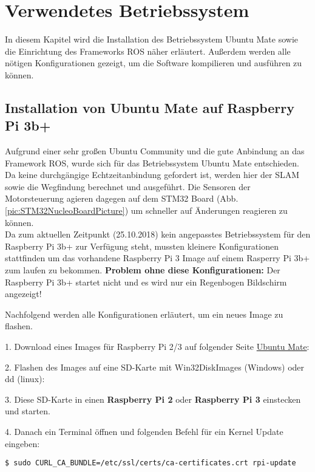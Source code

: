 \chapter{Verwendetes Betriebssystem}
In diesem Kapitel wird die Installation des Betriebssystem Ubuntu Mate sowie die Einrichtung des Frameworks ROS näher erläutert. Außerdem werden alle nötigen Konfigurationen gezeigt, um die Software kompilieren und ausführen zu können. 


\section{Installation von Ubuntu Mate auf Raspberry Pi 3b+}
Aufgrund einer sehr großen Ubuntu Community und die gute Anbindung an das Framework ROS, wurde sich für das Betriebssystem Ubuntu Mate entschieden. Da keine durchgängige Echtzeitanbindung gefordert ist, werden hier der SLAM sowie die Wegfindung berechnet und ausgeführt. Die Sensoren der Motorsteuerung agieren dagegen auf dem STM32 Board (Abb. \ref{pic:STM32NucleoBoardPicture}) um schneller auf Änderungen reagieren zu können.\\ 
Da zum aktuellen Zeitpunkt (25.10.2018) kein angepasstes Betriebssystem für den Raspberry Pi 3b+ zur Verfügung steht, mussten kleinere Konfigurationen stattfinden um das vorhandene Raspberry Pi 3 Image auf einem Rasperry Pi 3b+ zum laufen zu bekommen. 
\textbf{Problem ohne diese Konfigurationen:} Der Raspberry Pi 3b+ startet nicht und es wird nur ein Regenbogen Bildschirm angezeigt!

Nachfolgend werden alle Konfigurationen erläutert, um ein neues Image zu flashen. 

1. Download eines Images für Raspberry  Pi 2/3 auf folgender Seite \href{https://ubuntu-mate.org/download/}{Ubuntu Mate}:

2. Flashen des Images auf eine SD-Karte mit Win32DiskImages (Windows) oder dd (linux):

3. Diese SD-Karte in einen \textbf{Raspberry Pi 2} oder \textbf{Raspberry Pi 3} einstecken und starten. 

4. Danach ein Terminal öffnen und folgenden Befehl für ein Kernel Update eingeben:\\

\begin{lstlisting}
$ sudo CURL_CA_BUNDLE=/etc/ssl/certs/ca-certificates.crt rpi-update
\end{lstlisting}
\vspace{-0.8cm}

